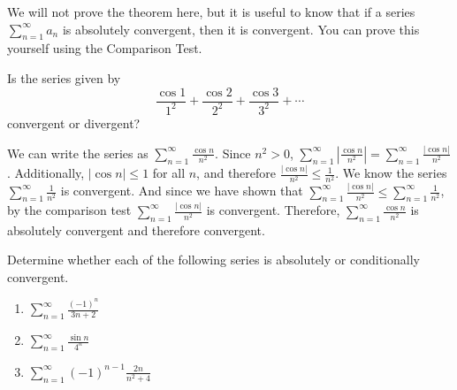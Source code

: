 We will not prove the theorem here, but it is useful to know that if a series 
$\sum_{n=1}^\infty a_n$ is absolutely convergent, then it is convergent. You 
can prove this yourself using the Comparison Test. 

\begin{Exercise}[label = absconv1]
Is the series given by 
$$\frac{\cos{1}}{1^2} + \frac{\cos{2}}{2^2} + \frac{\cos{3}}{3^2} + \cdots$$
convergent or divergent?
\vspace{40mm}
\end{Exercise}

\begin{Answer}[ref = absconv1]
We can write the series as $\sum_{n=1}^\infty \frac{\cos{n}}{n^2}$. Since $n^2 > 0$, $\sum_{n=1}^\infty 
\left| \frac{\cos{n}}{n^2} \right| = \sum_{n=1}^\infty \frac{|\cos{n}|}
{n^2}$. Additionally, $|\cos{n}| \leq 1$ for all $n$, and therefore 
$\frac{|\cos{n}|}{n^2} \leq \frac{1}{n^2}$. We know the series $\sum_{n=1}^
\infty \frac{1}{n^2}$ is convergent. And since we have shown that $\sum_{n=1}
^\infty \frac{|\cos{n}|}{n^2} \leq \sum_{n=1}^\infty \frac{1}{n^2}$, by the 
comparison test $\sum_{n=1}^\infty \frac{|\cos{n}|}{n^2}$ is convergent. 
Therefore, $\sum_{n=1}^\infty \frac{\cos{n}}{n^2}$ is absolutely convergent 
and therefore convergent. 
\end{Answer}

\begin{Exercise}[label = absconv2]
Determine whether each of the following series is absolutely or conditionally 
convergent. 
\begin{enumerate}
\item $\sum_{n=1}^\infty \frac{(-1)^n}{3n + 2}$
\item $\sum_{n=1}^\infty \frac{\sin{n}}{4^n}$
\item $\sum_{n=1}^\infty (-1)^{n-1} \frac{2n}{n^2 + 4}$ 
\end{enumerate}
\vspace{50mm}
\end{Exercise}

